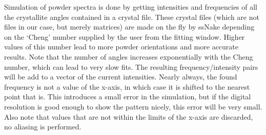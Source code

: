 \documentclass[11pt,a4paper]{article}
\begin{document}
Simulation of powder spectra is done by getting intensities and frequencies of all the crystallite angles contained in a crystal file. These crystal files (which are not files in our case, but merely matrices) are made on the fly by ssNake depending on the `Cheng' number supplied by the user from the fitting window. Higher values of this number lead to more powder orientations and more accurate results. Note that the number of angles increases exponentially with the Cheng number, which can lead to very slow fits. The resulting frequency/intensity pairs will be add to a vector of the current intensities. Nearly always, the found frequency is not a value of the x-axis, in which case it is shifted to the nearest point that is. This introduces a small error in the simulation, but if the digital resolution is good enough to show the pattern nicely, this error will be very small. Also note that values that are not within the limits of the x-axis are discarded, no aliasing is performed.
\end{document}
